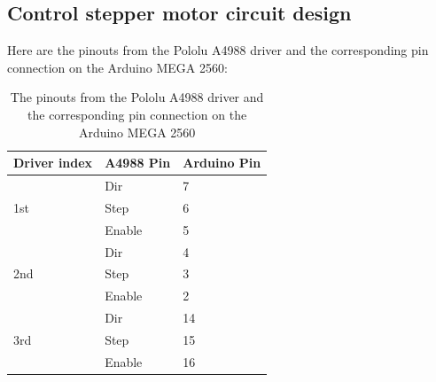 \subsection{Control stepper motor circuit design}
Here are the pinouts from the Pololu A4988 driver and the corresponding pin connection on the Arduino MEGA 2560:
\begin{table}[H]
	\centering
	\caption{The pinouts from the Pololu A4988 driver and the corresponding pin connection on the Arduino MEGA 2560}	
	\label{tab:A4988_connectto_Arduino}
	\begin{tabularx}{0.65\textwidth}{lll}
		\toprule
		\textbf{Driver index} & \textbf{A4988 Pin} & \textbf{Arduino Pin} \\
		\midrule
		\multirow{3}{*}{1st}	& Dir       & 7            \\
		                   	 	& Step      & 6            \\
		                   	 	& Enable    & 5            \\
		\midrule
		\multirow{3}{*}{2nd} 	& Dir       & 4            \\
		                   	 	& Step      & 3            \\
		                   	 	& Enable    & 2            \\
       	\midrule
      	\multirow{3}{*}{3rd} 	& Dir       & 14           \\
		                   	 	& Step      & 15           \\
		                   		& Enable    & 16           \\
		\bottomrule
	\end{tabularx}
\end{table}

